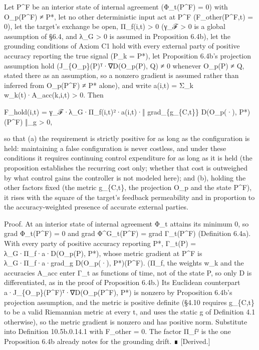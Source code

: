 \documentclass[
]{article}
\begin{document}
Let P\^{}F be an interior state of internal agreement (Φ\_t(P\^{}F) = 0)
with O\_p(P\^{}F) ≠ P*, let no other deterministic input act at P\^{}F
(F\_other(P\^{}F,t) = 0), let the target's exchange be open, Π\_f(i,t)
\textgreater{} 0 (γ\_ℱ \textgreater{} 0 is a global assumption of §6.4,
and λ\_G \textgreater{} 0 is assumed in Proposition 6.4b), let the
grounding conditions of Axiom C1 hold with every external party of
positive accuracy reporting the true signal (P\_k = P*), let Proposition
6.4b's projection assumption hold (J\_\{O\_p\}(P)ᵀ·∇D(O\_p(P), Q) ≠ 0
whenever O\_p(P) ≠ Q, stated there as an assumption, so a nonzero
gradient is assumed rather than inferred from O\_p(P\^{}F) ≠ P* alone),
and write a(i,t) = Σ\_k w\_k(t)·A\_acc(k,i,t) \textgreater{} 0. Then

F\_hold(i,t) = γ\_ℱ·λ\_G·Π\_f(i,t)²·a(i,t)·‖ grad\_\{g\_\{C,t\}\}
D(O\_p(·), P*)(P\^{}F) ‖\_g \textgreater{} 0,

so that (a) the requirement is strictly positive for as long as the
configuration is held: maintaining a false configuration is never
costless, and under these conditions it requires continuing control
expenditure for as long as it is held (the proposition establishes the
recurring cost only; whether that cost is outweighed by what control
gains the controller is not modeled here); and (b), holding the other
factors fixed (the metric g\_\{C,t\}, the projection O\_p and the state
P\^{}F), it rises with the square of the target's feedback permeability
and in proportion to the accuracy-weighted presence of accurate external
parties.

Proof. At an interior state of internal agreement Φ\_t attains its
minimum 0, so grad Φ\_t(P\^{}F) = 0 and grad Φ\^{}G\_t(P\^{}F) = grad
Γ\_t(P\^{}F) (Definition 6.4a). With every party of positive accuracy
reporting P*, Γ\_t(P) = λ\_G·Π\_f·a·D(O\_p(P), P*), whose metric
gradient at P\^{}F is λ\_G·Π\_f·a·grad\_g D(O\_p(·), P*)(P\^{}F). (Π\_f,
the weights w\_k and the accuracies A\_acc enter Γ\_t as functions of
time, not of the state P, so only D is differentiated, as in the proof
of Proposition 6.4b.) Its Euclidean counterpart
a·J\_\{O\_p\}(P\^{}F)ᵀ·∇D(O\_p(P\^{}F), P*) is nonzero by Proposition
6.4b's projection assumption, and the metric is positive definite (§4.10
requires g\_\{C,t\} to be a valid Riemannian metric at every t, and uses
the static g of Definition 4.1 otherwise), so the metric gradient is
nonzero and has positive norm. Substitute into Definition 10.5b.0.14.1
with F\_other = 0. The factor Π\_f² is the one Proposition 6.4b already
notes for the grounding drift. ∎ {[}Derived.{]}
\end{document}
